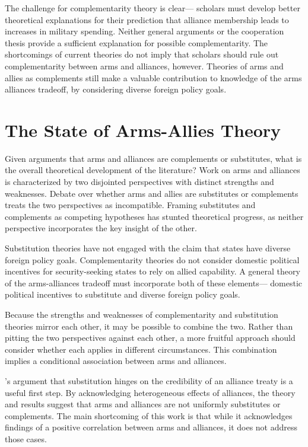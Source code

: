 \documentclass[12pt]{article}
\begin{document}
The challenge for complementarity theory is clear--- scholars must develop better theoretical explanations for their prediction that alliance membership leads to increases in military spending. Neither general arguments or the cooperation thesis provide a sufficient explanation for possible complementarity. The shortcomings of current theories do not imply that scholars should rule out complementarity between arms and alliances, however. Theories of arms and allies as complements still make a valuable contribution to knowledge of the arms alliances tradeoff, by considering diverse foreign policy goals. 


\section*{The State of Arms-Allies Theory}

Given arguments that arms and alliances are complements or substitutes, what is the overall theoretical development of the literature? Work on arms and alliances is characterized by two disjointed perspectives with distinct strengths and weaknesses. Debate over whether arms and allies are substitutes or complements treats the two perspectives as incompatible. Framing substitutes and complements as competing hypotheses has stunted theoretical progress, as neither perspective incorporates the key insight of the other. 

Substitution theories have not engaged with the claim that states have diverse foreign policy goals. Complementarity theories do not consider domestic political incentives for security-seeking states to rely on allied capability. A general theory of the arms-alliances tradeoff must incorporate both of these elements--- domestic political incentives to substitute and diverse foreign policy goals. 

Because the strengths and weaknesses of complementarity and substitution theories mirror each other, it may be possible to combine the two. Rather than pitting the two perspectives against each other, a more fruitful approach should consider whether each applies in different circumstances. This combination implies a conditional association between arms and alliances. 

\citet{DigiuseppePoast2016}'s argument that substitution hinges on the credibility of an alliance treaty is a useful first step. By acknowledging heterogeneous effects of alliances, the theory and results suggest that arms and alliances are not uniformly substitutes or complements. The main shortcoming of this work is that while it acknowledges findings of a positive correlation between arms and alliances, it does not address those cases. 
\end{document}
